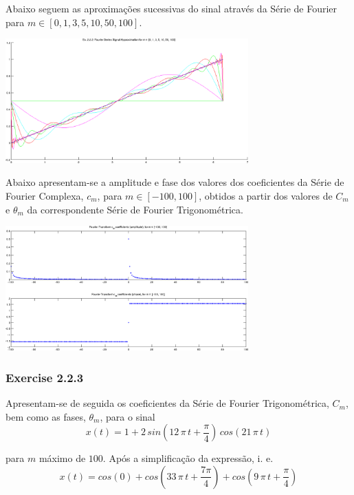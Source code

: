 \documentclass[a4paper]{article}
\begin{document}
\noindent Abaixo seguem as aproximações sucessivas do sinal através da Série de Fourier para $m \in [0, 1, 3, 5, 10, 50, 100]$.
\begin{center}
	\includegraphics[width=0.70\textwidth]{images/ex2_2_2_approx.png}
	\label{fig:ex2_2_2_approx}
\end{center}

\noindent Abaixo apresentam-se a amplitude e fase dos valores dos coeficientes da Série de Fourier Complexa, $c_m$, para $m \in [-100, 100]$, obtidos a partir dos valores de $C_m$ e $\theta_m$ da correspondente Série de Fourier Trigonométrica.
\begin{center}
	\includegraphics[width=0.70\textwidth]{images/ex2_2_2_complex_cm.png}
	\label{fig:ex2_2_2_complex_cm}
\end{center}

\subsubsection{Exercise 2.2.3}
\noindent Apresentam-se de seguida os coeficientes da Série de Fourier Trigonométrica, $C_m$, bem como as fases, $\theta_m$, para o sinal
\[
	x(t) = 1 + 2 \, sin\left(12 \, \pi \, t + \frac{\pi}{4}\right) \, cos(21 \, \pi \, t)
\]

\noindent para $m$ máximo de $100$. Após a simplificação da expressão, i. e.
\[
	x(t) = cos(0) + cos\left(33 \, \pi \, t + \frac{7 \pi}{4}\right) + cos\left(9 \, \pi \, t + \frac{\pi}{4}\right)
\]
\end{document}
